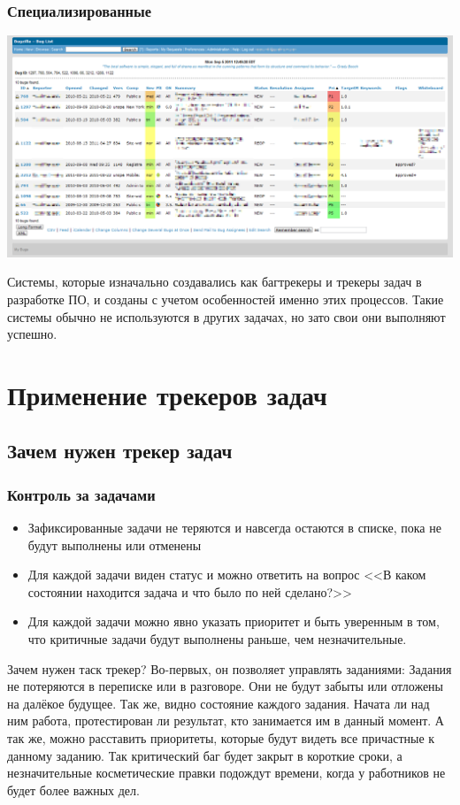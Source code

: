 \documentclass{../industrial-development}
\begin{document}
\begin{frame} \frametitle{Специализированные}
	\centerline{\includegraphics[width=\textwidth]{bugzilla.png}}
\end{frame}

\lecturenotes
Системы, которые изначально создавались как багтрекеры и трекеры задач в разработке ПО, и созданы с учетом особенностей именно этих процессов. Такие системы обычно не используются в других задачах, но зато свои они выполняют успешно.

\section{Применение трекеров задач}

\subsection{Зачем нужен трекер задач}

\begin{frame} \frametitle{Контроль за задачами}
	\begin{itemize}
		\item Зафиксированные задачи не теряются и навсегда остаются в списке, пока не будут выполнены или отменены
		\item Для каждой задачи виден статус и можно ответить на вопрос <<В каком состоянии находится задача и что было по ней сделано?>>
		\item Для каждой задачи можно явно указать приоритет и быть уверенным в том, что критичные задачи будут выполнены раньше, чем незначительные.
	\end{itemize}
\end{frame}

\lecturenotes
Зачем нужен таск трекер?
Во-первых, он позволяет управлять заданиями: 
Задания не потеряются в переписке или в разговоре. Они не будут забыты или отложены на далёкое будущее.
Так же, видно состояние каждого задания. Начата ли над ним работа, протестирован ли результат, кто занимается им в данный момент.
А так же, можно расставить приоритеты, которые будут видеть все причастные к данному заданию. Так критический баг будет закрыт в короткие сроки, а незначительные косметические правки подождут времени, когда у работников не будет более важных дел.
\end{document}

